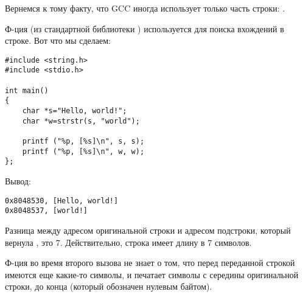 \label{strstr_example}

Вернемся к тому факту, что GCC иногда использует только часть строки: .

Ф-ция  (из стандартной библиотеки \CCpp) используется для поиска вхождений в строке.
Вот что мы сделаем:

\begin{lstlisting}[style=customc]
#include <string.h>
#include <stdio.h>

int main()
{
	char *s="Hello, world!";
	char *w=strstr(s, "world");

	printf ("%p, [%s]\n", s, s);
	printf ("%p, [%s]\n", w, w);
};
\end{lstlisting}

Вывод:

\begin{lstlisting}
0x8048530, [Hello, world!]
0x8048537, [world!]
\end{lstlisting}

Разница между адресом оригинальной строки и адресом подстроки, который вернула , это 7.
Действительно, строка  имеет длину в 7 символов.

Ф-ция \printf{} во время второго вызова не знает о том, что перед переданной строкой имеются еще какие-то символы,
и печатает символы с середины оригинальной строки, до конца (который обозначен нулевым байтом).


